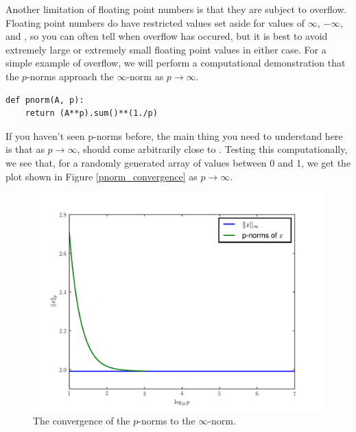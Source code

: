Another limitation of floating point numbers is that they are subject to overflow.
Floating point numbers do have restricted values set aside for values of $\infty$, $-\infty$, and , so you can often tell when overflow has occured, but it is best to avoid extremely large or extremely small floating point values in either case.
For a simple example of overflow, we will perform a computational demonstration that the $p$-norms approach the $\infty$-norm as $p \rightarrow \infty$.
\begin{lstlisting}
def pnorm(A, p):
    return (A**p).sum()**(1./p)
\end{lstlisting}
If you haven't seen p-norms before, the main thing you need to understand here is that as $p \rightarrow \infty$,  should come arbitrarily close to .
Testing this computationally, we see that, for a randomly generated array of values between 0 and 1, we get the plot shown in Figure \ref{pnorm_convergence} as $p \rightarrow \infty$.

\begin{figure}
\includegraphics[width=\textwidth]{pnorm_convergence.pdf}
\caption{The convergence of the $p$-norms to the $\infty$-norm.}
\end{figure}

